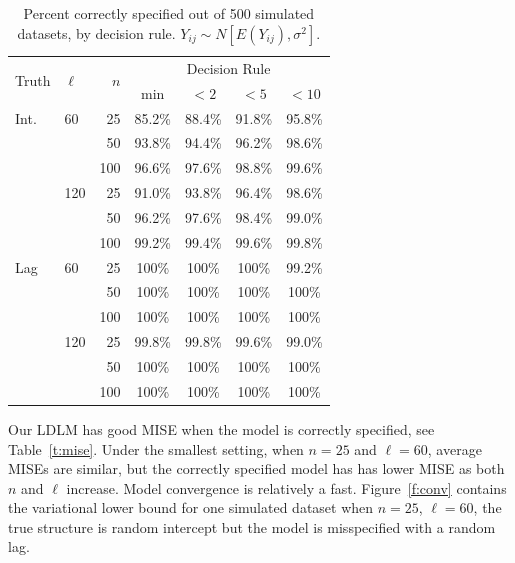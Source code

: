 \documentclass[10pt]{article}
\begin{document}
\begin{table}
\caption{Percent correctly specified out of 500 simulated datasets, by decision rule. $Y_{ij}\sim N[E(Y_{ij}), \sigma^2]$.\\ \label{t:correct}}
\begin{tabular}{llrcccc}
\hline
  \hline
 \multirow{2}{*}{Truth} & \multirow{2}{*}{$\ell$} & \multirow{2}{*}{$n$}  & \multicolumn{4}{c}{Decision Rule}  \\
\cline{4-7}
 &  &  & $\min$ & $< 2$ & $< 5$ & $< 10$ \\ 
  \hline
 Int. & 60 & 25 & 85.2\% & 88.4\% & 91.8\% & 95.8\% \\  
  &  & 50 & 93.8\% & 94.4\% & 96.2\% & 98.6\% \\
  &  & 100 & 96.6\% & 97.6\% & 98.8\% & 99.6\% \\
   \cline{3-7}
  & 120 & 25 & 91.0\%  & 93.8\% & 96.4\% & 98.6\% \\
  &  & 50  & 96.2\% & 97.6\% & 98.4\% & 99.0\% \\ 
  &  & 100 & 99.2\% & 99.4\%& 99.6\% & 99.8\% \\ 
   \cline{2-7}
 Lag & 60 & 25 & 100\% & 100\% & 100\% & 99.2\%  \\  
  &  & 50 & 100\% & 100\% & 100\% & 100\% \\
  &  & 100 & 100\% & 100\% & 100\% & 100\% \\
   \cline{3-7}
 & 120 & 25 & 99.8\% & 99.8\% & 99.6\% & 99.0\% \\
  &  & 50  & 100\% & 100\% & 100\% & 100\% \\ 
  &  & 100 & 100\% & 100\% & 100\% & 100\% \\ 
\hline
\hline
\end{tabular}
\end{table}

Our LDLM has good MISE when the model is correctly specified, see Table~\ref{t:mise}. Under the smallest setting, when $n = 25$ and $\ell = 60$, average MISEs are similar, but the correctly specified model has has lower MISE as both $n$ and $\ell$ increase. Model convergence is relatively a fast. Figure~\ref{f:conv} contains the variational lower bound for one simulated dataset when $n = 25$, $\ell = 60$, the true structure is random intercept but the model is misspecified with a random lag.
\end{document}
